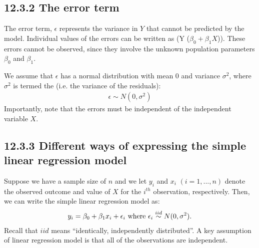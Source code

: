 \documentclass[letterpaper,10pt,english]{jupyterBook}
\begin{document}
\noindent{}


\subsection{12.3.2 The error term}
\label{\detokenize{12.d. Linear Regression I:the-error-term}}
\sphinxAtStartPar
The error term, \(\epsilon\) represents the variance in \(Y\) that cannot be predicted by the model. Individual values of the errors can be written as (Y \sphinxhyphen{}  (\(\beta_0 + \beta_1X\))). These errors cannot be observed, since they involve the unknown population parameters \(\beta_0\) and \(\beta_1\).

\sphinxAtStartPar
We assume that \(\epsilon\) has a normal distribution with mean 0 and variance \(\sigma^2\), where \(\sigma^2\) is termed the  (i.e. the variance of the residuals):
\begin{equation*}
\begin{split}
\epsilon \sim N(0,\sigma^2)
\end{split}
\end{equation*}
\sphinxAtStartPar
Importantly, note that the errors must be independent of the independent variable \(X\).


\subsection{12.3.3 Different ways of expressing the simple linear regression model}
\label{\detokenize{12.d. Linear Regression I:different-ways-of-expressing-the-simple-linear-regression-model}}
\sphinxAtStartPar
Suppose we have a sample size of \(n\) and we let \(y_i\) and \(x_i\) \((i=1,...,n)\) denote the observed outcome and value of \(X\) for the \(i^{th}\) observation, respectively. Then, we can write the simple linear regression model as:
\begin{equation*}
\begin{split}
y_i = \beta_0 + \beta_1 x_{i}+ \epsilon_i \text{ where } \epsilon_i \overset{\small{iid}}{\sim} N(0, \sigma^2).
\end{split}
\end{equation*}
\sphinxAtStartPar
Recall that \(iid\) means “identically, independently distributed”. A key assumption of linear regression model is that all of the observations are independent.
\end{document}

